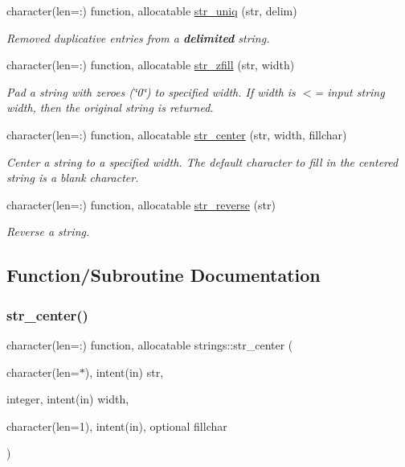 \begin{DoxyCompactItemize}
character(len=\+:) function, allocatable \mbox{\hyperlink{namespacestrings_a8a6ee3280b88b0c63aa79b8095bd20ef}{str\+\_\+uniq}} (str, delim)
\begin{DoxyCompactList}\small\item\em Removed duplicative entries from a {\bfseries{delimited}} string. \end{DoxyCompactList}\item 
character(len=\+:) function, allocatable \mbox{\hyperlink{namespacestrings_af7c5fa6249abe3060899aab8ce88686e}{str\+\_\+zfill}} (str, width)
\begin{DoxyCompactList}\small\item\em Pad a string with zeroes (\char`\"{}0\char`\"{}) to specified width. If width is $<$= input string width, then the original string is returned. \end{DoxyCompactList}\item 
character(len=\+:) function, allocatable \mbox{\hyperlink{namespacestrings_a4200b0c5200b64c2c2a6ce8862e2af58}{str\+\_\+center}} (str, width, fillchar)
\begin{DoxyCompactList}\small\item\em Center a string to a specified width. The default character to fill in the centered string is a blank character. \end{DoxyCompactList}\item 
character(len=\+:) function, allocatable \mbox{\hyperlink{namespacestrings_a71f27e53beff6353ceead343b10761ec}{str\+\_\+reverse}} (str)
\begin{DoxyCompactList}\small\item\em Reverse a string. \end{DoxyCompactList}\end{DoxyCompactItemize}


\subsection{Function/\+Subroutine Documentation}
\mbox{\label{namespacestrings_a4200b0c5200b64c2c2a6ce8862e2af58}} 
\subsubsection{\texorpdfstring{str\_center()}{str\_center()}}
{\footnotesize\ttfamily character(len=\+:) function, allocatable strings\+::str\+\_\+center (\begin{DoxyParamCaption}\item[{character(len=$\ast$), intent(in)}]{str,  }\item[{integer, intent(in)}]{width,  }\item[{character(len=1), intent(in), optional}]{fillchar }\end{DoxyParamCaption})}



